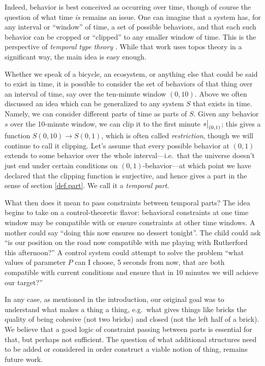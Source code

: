 Indeed, behavior is best conceived as occurring over time, though of course the question of what time \emph{is} remains an issue. One can imagine that a system has, for any interval or ``window'' of time, a set of possible behaviors, and that each such behavior can be cropped or ``clipped'' to any smaller window of time. This is the perspective of \emph{temporal type theory} \cite{Schultz.Spivak:2017a}. While that work uses topos theory in a significant way, the main idea is easy enough.

Whether we speak of a bicycle, an ecosystem, or anything else that could be said to exist in time, it is possible to consider the set of behaviors of that thing over an interval of time, say over the ten-minute window $(0,10)$. Above we often discussed an idea which can be generalized to any system $S$ that exists in time. Namely, we can consider different parts of time as parts of $S$. Given any behavior $s$ over the 10-minute window, we can clip it to the first minute $s\big|_{(0,1)}$; this gives a function $S(0,10)\to S(0,1)$, which is often called \emph{restriction}, though we will continue to call it clipping. Let's assume that every possible behavior at $(0,1)$ extends to some behavior over the whole interval---i.e.\ that the universe doesn't just end under certain conditions on $(0,1)$-behavior---at which point we have declared that the clipping function is surjective, and hence gives a part in the sense of section \cref{def.part}. We call it a \emph{temporal part}.

What then does it mean to pass constraints between temporal parts? The idea begins to take on a control-theoretic flavor: behavioral constraints at one time window may be compatible with or ensure constraints at other time windows. A mother could say ``doing this now ensures no dessert tonight''. The child could ask ``is our position on the road now compatible with me playing with Rutherford this afternoon?'' A control system could attempt to solve the problem ``what values of parameter $P$ can I choose, 5 seconds from now, that are both compatible with current conditions and ensure that in 10 minutes we will achieve our target?''

In any case, as mentioned in the introduction, our original goal was to understand what makes a thing a thing, e.g.\ what gives things like bricks the quality of being cohesive (not two bricks) and closed (not the left half of a brick). We believe that a good logic of constraint passing between parts is essential for that, but perhaps not sufficient. The question of what additional structures need to be added or considered in order construct a viable notion of thing, remains future work.